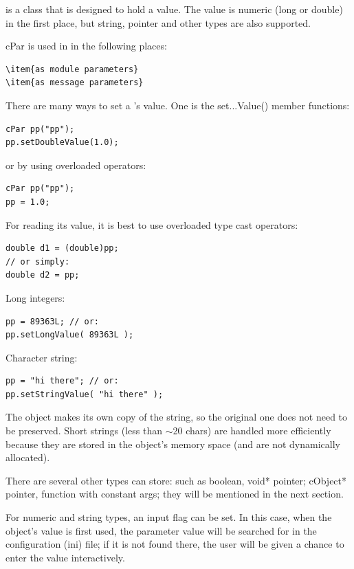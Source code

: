  is a class that is designed to hold a value. The value
is numeric (long or double) in the first place, but string, pointer
and other types are also supported.

cPar is used in {\opp} in the following places:
\begin{Verbatim}
\item{as module parameters}
\item{as message parameters}
\end{Verbatim}

There are many ways to set a 's value. One is the set...Value() 
member functions:

\begin{Verbatim}
cPar pp("pp");
pp.setDoubleValue(1.0);
\end{Verbatim}


or by using overloaded operators:

\begin{Verbatim}
cPar pp("pp");
pp = 1.0;
\end{Verbatim}


For reading its value, it is best to use overloaded type cast 
operators:

\begin{Verbatim}
double d1 = (double)pp;
// or simply:
double d2 = pp;
\end{Verbatim}

Long integers:

\begin{Verbatim}
pp = 89363L; // or:
pp.setLongValue( 89363L );
\end{Verbatim}

Character string:

\begin{Verbatim}
pp = "hi there"; // or:
pp.setStringValue( "hi there" );
\end{Verbatim}


The  object makes its own copy of the string, so the
original one does not need to be preserved. Short strings (less than
\ensuremath{\sim}20 chars) are handled more efficiently because they
are stored in the object's memory space (and are not dynamically
allocated).

There are several other types  can store: such as boolean, 
void* pointer; cObject* pointer,  function with constant args; 
they will be mentioned in the next section.

For numeric and string types, an input flag can be
set. In this case, when the object's value is first used, the
parameter value will be searched for in the configuration (ini)
file; if it is not found there, the user will be given
a chance to enter the value interactively.


